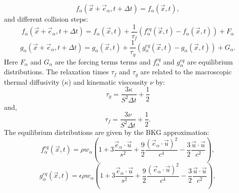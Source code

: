 \documentclass{article}
\begin{document}
\begin{equation}
	f_{\alpha}(\vec{x} + \vec{e}_\alpha, t + \Delta t) = f_{\alpha}(\vec{x}, t),
	\label{streaming step}
\end{equation}
and different collision steps:
\begin{equation}
	f_{\alpha}(\vec{x} + \vec{e}_{\alpha}, t + \Delta t) = f_{\alpha}(\vec{x}, t) + \frac{1}{\tau_f} (f^{eq}_{\alpha}(\vec{x}, t)  - f_{\alpha}(\vec{x}, t)) + F_{\alpha}
	\label{f collision step}
\end{equation}
\begin{equation}
	g_{\alpha}(\vec{x} + \vec{e}_{\alpha}, t + \Delta t) = g_{\alpha}(\vec{x}, t) + \frac{1}{\tau_g} (g^{eq}_{\alpha}(\vec{x}, t)  - g_{\alpha}(\vec{x}, t)) + G_{\alpha}.
	\label{g collision step}
\end{equation}
Here $F_{\alpha}$ and $G_{\alpha}$ are the forcing terms terms and $f^{eq}_{\alpha}$ and $g^{eq}_{\alpha}$ are equilibrium distributions. The relaxation times $\tau_f$ and $\tau_g$ are related to the macroscopic thermal diffusivity ($\kappa$) and kinematic viscousity $\nu$ by:
\begin{equation}
	\tau_g = \frac{3 \kappa}{S^2 \Delta t} + \frac{1}{2}
\end{equation}
and,
\begin{equation}
	\tau_f = \frac{3 \nu}{S^2 \Delta t} + \frac{1}{2}.
\end{equation}
The equilibrium distributions are given by the BKG approximation:
\begin{equation}
	f^{eq}_{\alpha}(\vec{x}, t)  = \rho w_{\alpha} (1 + 3 \frac{\vec{e}_{\alpha} \cdot \vec{u}}{s^2} + \frac{9}{2} \frac{(\vec{e}_{\alpha} \cdot \vec{u}  )^2}{c^4} - \frac{3}{2} \frac{\vec{u} \cdot \vec{u}}{c^2}  ),
\end{equation}
\begin{equation}
	g^{eq}_{\alpha}(\vec{x}, t)  = \epsilon \rho w_{\alpha} (1 + 3 \frac{\vec{e}_{\alpha} \cdot \vec{u}}{s^2} + \frac{9}{2} \frac{(\vec{e}_{\alpha} \cdot \vec{u}  )^2}{c^4} - \frac{3}{2} \frac{\vec{u} \cdot \vec{u}}{c^2}  ),
\end{equation}
\end{document}
